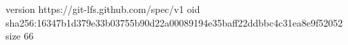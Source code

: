 version https://git-lfs.github.com/spec/v1
oid sha256:16347b1d379e33b03755b90d22a00089194e35baff22ddbbc4c31ea8e9f52052
size 66
